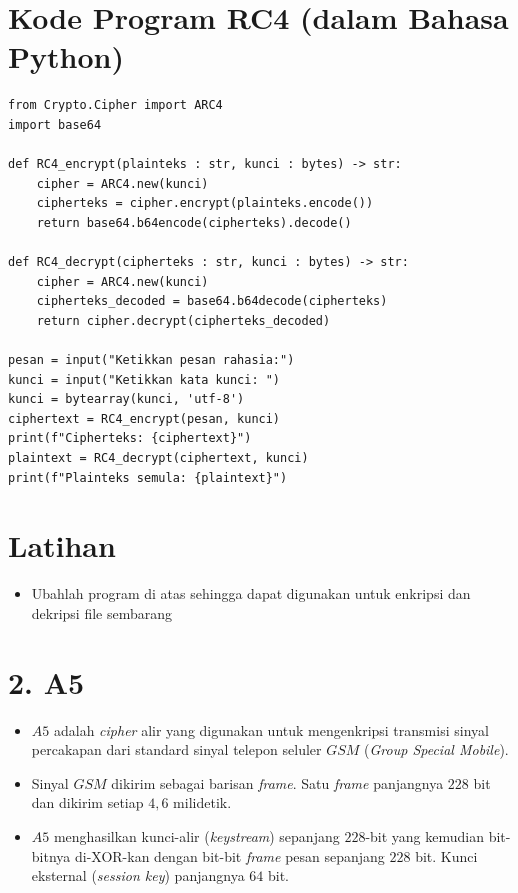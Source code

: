 \documentclass{article}
\begin{document}
\newpage


\section*{Kode Program RC4 (dalam Bahasa Python)}

\begin{verbatim}
from Crypto.Cipher import ARC4
import base64

def RC4_encrypt(plainteks : str, kunci : bytes) -> str:
    cipher = ARC4.new(kunci)
    cipherteks = cipher.encrypt(plainteks.encode())
    return base64.b64encode(cipherteks).decode()

def RC4_decrypt(cipherteks : str, kunci : bytes) -> str:
    cipher = ARC4.new(kunci)
    cipherteks_decoded = base64.b64decode(cipherteks)
    return cipher.decrypt(cipherteks_decoded)

pesan = input("Ketikkan pesan rahasia:")
kunci = input("Ketikkan kata kunci: ")
kunci = bytearray(kunci, 'utf-8')
ciphertext = RC4_encrypt(pesan, kunci)
print(f"Cipherteks: {ciphertext}")
plaintext = RC4_decrypt(ciphertext, kunci)
print(f"Plainteks semula: {plaintext}")
\end{verbatim}

\newpage


\section*{Latihan}

\begin{itemize}
    \item Ubahlah program di atas sehingga dapat digunakan untuk enkripsi dan dekripsi file sembarang
\end{itemize}

\newpage


\section*{2. A5}

\begin{itemize}
    \item $A5$ adalah \textit{cipher} alir yang digunakan untuk mengenkripsi transmisi sinyal percakapan dari standard sinyal telepon seluler $GSM$ (\textit{Group Special Mobile}).
    \item Sinyal $GSM$ dikirim sebagai barisan \textit{frame}. Satu \textit{frame} panjangnya $228$ bit dan dikirim setiap $4,6$ milidetik.
    \item $A5$ menghasilkan kunci-alir (\textit{keystream}) sepanjang $228$-bit yang kemudian bit-bitnya di-XOR-kan dengan bit-bit \textit{frame} pesan sepanjang $228$ bit. Kunci eksternal (\textit{session key}) panjangnya $64$ bit.
\end{itemize}
\end{document}
